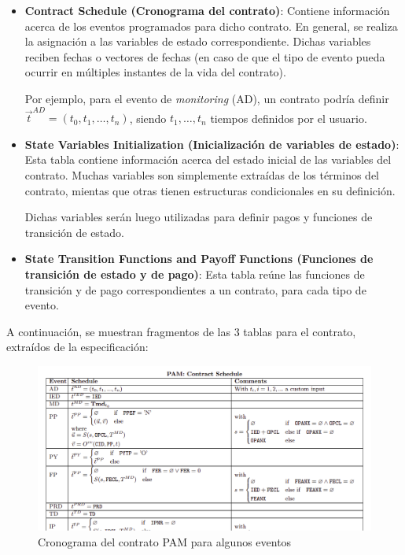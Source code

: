 \documentclass[12pt]{book}
\begin{document}
\begin{itemize}
    \item \textbf{Contract Schedule (Cronograma del contrato)}: Contiene información acerca de los eventos programados para dicho contrato. En general, se realiza la asignación a las variables de estado correspondiente. Dichas variables reciben fechas o vectores de fechas (en caso de que el tipo de evento pueda ocurrir en múltiples instantes de la vida del contrato).

          Por ejemplo, para el evento de \textit{monitoring} (AD), un contrato podría definir $\vec{t}^{AD} = \left(t_0,t_1, \ldots ,t_n\right)$, siendo $t_1, \ldots, t_n$ tiempos definidos por el usuario.

    \item \textbf{State Variables Initialization (Inicialización de variables de estado)}: Esta tabla contiene información acerca del estado inicial de las variables del contrato. Muchas variables son simplemente extraídas de los términos del contrato, mientas que otras tienen estructuras condicionales en su definición.

          Dichas variables serán luego utilizadas para definir pagos y funciones de transición de estado.

    \item \textbf{State Transition Functions and Payoff Functions (Funciones de transición de estado y de pago)}:
          Esta tabla reúne las funciones de transición y de pago correspondientes a un contrato, para cada tipo de evento.


\end{itemize}


A continuación, se muestran fragmentos de las 3 tablas para el contrato, extraídos de la especificación:

\begin{figure}
    \centering
    \includegraphics[width=\textwidth]{PAM_Contract_Schedule.png}
    \caption{Cronograma del contrato PAM para algunos eventos}\label{fig:PAM_Contract_Schedule}
\end{figure}
\end{document}
